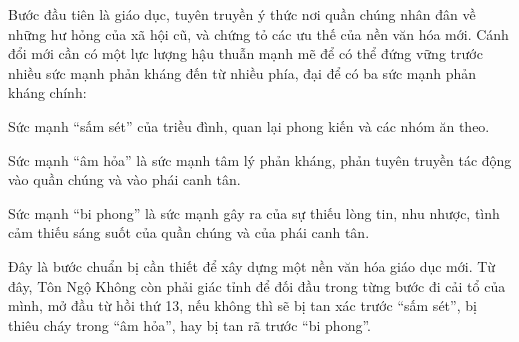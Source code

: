 Bước đầu tiên là giáo dục, tuyên truyền ý thức nơi quần chúng nhân đân về những hư hỏng của xã hội cũ, và chứng tỏ các ưu thế của nền văn hóa mới. Cánh đổi mới cần có một lực lượng hậu thuẫn mạnh mẽ để có thể đứng vững trước nhiều sức mạnh phản kháng đến từ nhiều phía, đại để có ba sức mạnh phản kháng chính:

\begin{newenumerate}
    \item Sức mạnh ``sấm sét'' của triều đình, quan lại phong kiến và các nhóm ăn theo.

    \item Sức mạnh ``âm hỏa'' là sức mạnh tâm lý phản kháng, phản tuyên truyền tác động vào quần chúng và vào phái canh tân.

    \item Sức mạnh ``bi phong'' là sức mạnh gây ra của sự thiếu lòng tin, nhu nhược, tình cảm thiếu sáng suốt của quần chúng và của phái canh tân.
\end{newenumerate}

Đây là bước chuẩn bị cần thiết để xây dựng một nền văn hóa giáo dục mới. Từ đây, Tôn Ngộ Không còn phải giác tỉnh để đối đầu trong từng bước đi cải tổ của mình, mở đầu từ hồi thứ 13, nếu không thì sẽ bị tan xác trước ``sấm sét'', bị thiêu cháy trong ``âm hỏa'', hay bị tan rã trước ``bi phong''.

